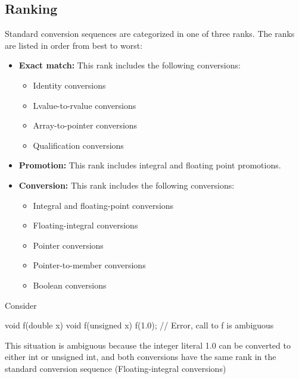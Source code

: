 \documentclass{report}
\begin{document}
    \subsection{Ranking}
    \bigbreak \noindent 
    Standard conversion sequences are categorized in one of three ranks. The ranks are listed in order from best to worst:
    \begin{itemize}
        \item \textbf{Exact match:} This rank includes the following conversions:
            \begin{itemize}
                \item Identity conversions
                \item Lvalue-to-rvalue conversions
                \item Array-to-pointer conversions
                \item Qualification conversions
            \end{itemize}
        \item \textbf{Promotion:} This rank includes integral and floating point promotions.
        \item \textbf{Conversion:} This rank includes the following conversions:
            \begin{itemize}
                \item Integral and floating-point conversions
                \item Floating-integral conversions
                \item Pointer conversions
                \item Pointer-to-member conversions
                \item Boolean conversions
            \end{itemize}
    \end{itemize}
    \bigbreak \noindent 
    Consider
    \bigbreak \noindent 
    \begin{cppcode}
        void f(double x) { }
        void f(unsigned x) { }
        f(1.0); // Error, call to f is ambiguous
    \end{cppcode}
    \bigbreak \noindent 
    This situation is ambiguous because the integer literal 1.0 can be converted to either int or unsigned int, and both conversions have the same rank in the standard conversion sequence (Floating-integral conversions)
\end{document}
